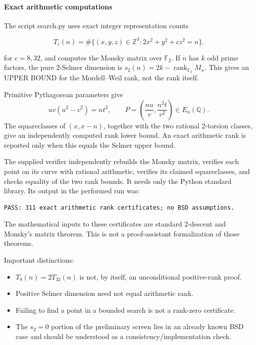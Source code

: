 \documentclass[11pt]{article}
\newcommand{\tightlist}{\setlength{\itemsep}{0pt}\setlength{\parskip}{0pt}}
\begin{document}
\paragraph{Exact arithmetic computations}

The script search.py uses exact integer representation counts

\[T_c(n)=\#\{(x,y,z)\in\mathbb Z^3:2x^2+y^2+cz^2=n\}.\]

for \(c=8,32\), and computes the Monsky matrix over \(\mathbb F_2\). If \(n\) has \(k\) odd prime factors, the pure 2-Selmer dimension is \(s_2(n)=2k-\operatorname{rank}_{\mathbb F_2}M_n\). This gives an UPPER BOUND for the Mordell--Weil rank, not the rank itself.

Primitive Pythagorean parameters give \[
 u v(u^2-v^2)=nt^2,\qquad
 P=\left(\frac{nu}{v},\frac{n^2t}{v^2}\right)\in E_n(\mathbb Q).
\] The squareclasses of \((x,x-n)\), together with the two rational 2-torsion classes, give an independently computed rank lower bound. An exact arithmetic rank is reported only when this equals the Selmer upper bound.

The supplied verifier independently rebuilds the Monsky matrix, verifies each point on its curve with rational arithmetic, verifies its claimed squareclasses, and checks equality of the two rank bounds. It needs only the Python standard library. Its output in the performed run was:

\begin{Verbatim}[breaklines=true,breakanywhere=true,fontsize=\small]
PASS: 311 exact arithmetic rank certificates; no BSD assumptions.
\end{Verbatim}

The mathematical inputs to these certificates are standard 2-descent and Monsky's matrix theorem. This is not a proof-assistant formalization of those theorems.

Important distinctions:

\begin{itemize}
\tightlist
\item
  \(T_8(n)=2T_{32}(n)\) is not, by itself, an unconditional positive-rank proof.
\item
  Positive Selmer dimension need not equal arithmetic rank.
\item
  Failing to find a point in a bounded search is not a rank-zero certificate.
\item
  The \(s_2=0\) portion of the preliminary screen lies in an already known BSD case and should be understood as a consistency/implementation check.
\end{itemize}
\end{document}
